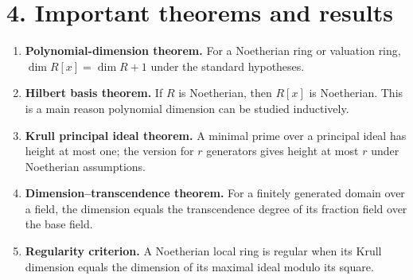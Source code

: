 \section*{4. Important theorems and results}
\begin{enumerate}[leftmargin=*,itemsep=0.35em]

\item \textbf{Polynomial-dimension theorem.} For a Noetherian ring or valuation ring, $\dim R[x]=\dim R+1$ under the standard hypotheses. \cite{dimension_theory_ref1}

\item \textbf{Hilbert basis theorem.} If $R$ is Noetherian, then $R[x]$ is Noetherian. This is a main reason polynomial dimension can be studied inductively. \cite{dimension_theory_ref2}

\item \textbf{Krull principal ideal theorem.} A minimal prime over a principal ideal has height at most one; the version for $r$ generators gives height at most $r$ under Noetherian assumptions. \cite{dimension_theory_ref4}

\item \textbf{Dimension--transcendence theorem.} For a finitely generated domain over a field, the dimension equals the transcendence degree of its fraction field over the base field. \cite{dimension_theory_ref3}

\item \textbf{Regularity criterion.} A Noetherian local ring is regular when its Krull dimension equals the dimension of its maximal ideal modulo its square. \cite{dimension_theory_ref5}
\end{enumerate}


